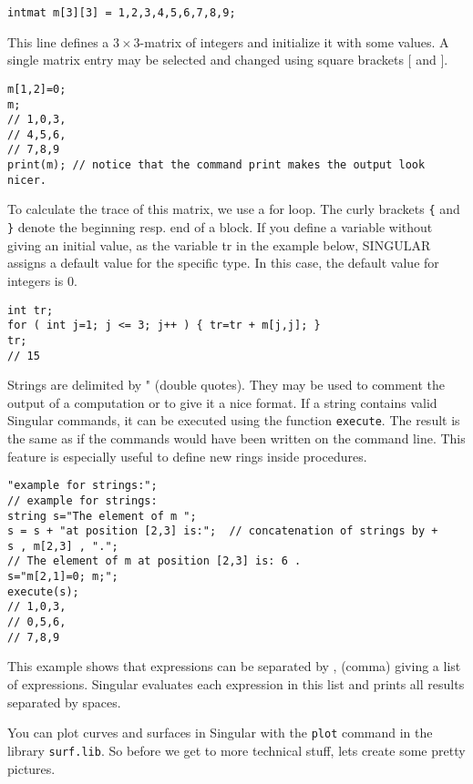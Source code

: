 \documentclass[12pt]{amsart}
\begin{document}
\begin{verbatim}
intmat m[3][3] = 1,2,3,4,5,6,7,8,9;
\end{verbatim}

This line defines a $3\times 3$-matrix of integers and initialize it with some values.
A single matrix entry may be selected and changed using square brackets $[$ and $]$.

\begin{verbatim}
m[1,2]=0;
m;
// 1,0,3,
// 4,5,6,
// 7,8,9
print(m); // notice that the command print makes the output look nicer.
\end{verbatim}

To calculate the trace of this matrix, we use a for loop. 
The curly brackets \verb+{+ and \verb+}+ denote the beginning resp. end of a block. 
If you define a variable without giving an initial value, as the variable 
tr in the example below, SINGULAR assigns a default value for the specific type. 
In this case, the default value for integers is 0. 

\begin{verbatim}
int tr;
for ( int j=1; j <= 3; j++ ) { tr=tr + m[j,j]; }
tr;
// 15
\end{verbatim}


Strings are delimited by " (double quotes). They may be used to comment 
the output of a computation or to give it a nice format. 
If a string contains valid Singular commands, it can be executed using the function 
\texttt{execute}. The result is the same as if the commands would have been 
written on the command line. This feature is especially useful to define new rings inside procedures.

\begin{verbatim}
"example for strings:";
// example for strings:
string s="The element of m ";
s = s + "at position [2,3] is:";  // concatenation of strings by +
s , m[2,3] , ".";
// The element of m at position [2,3] is: 6 .
s="m[2,1]=0; m;";
execute(s);
// 1,0,3,
// 0,5,6,
// 7,8,9
\end{verbatim}

This example shows that expressions can be separated by , (comma) 
giving a list of expressions. Singular evaluates each expression in this list and prints all results separated by spaces.


You can plot curves and surfaces in Singular with the \texttt{plot} command in 
the library \texttt{surf.lib}. So before we get to more technical stuff, 
lets create some pretty pictures.  
\end{document}
